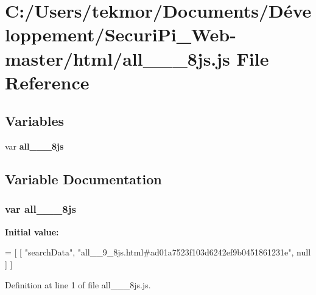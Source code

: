 \section{C\+:/\+Users/tekmor/\+Documents/\+Développement/\+Securi\+Pi\+\_\+\+Web-\/master/html/all\+\_\+\+\_\+\_\+8js.js File Reference}
\label{all____9__8js_8js}
\subsection*{Variables}
\begin{DoxyCompactItemize}
\item 
var {\bf all\+\_\+\+\_\+\_\+8js}
\end{DoxyCompactItemize}


\subsection{Variable Documentation}
\subsubsection[{all\+\_\+\+\_\+9\+\_\+8js}]{\setlength{\rightskip}{0pt plus 5cm}var all\+\_\+\+\_\+\_\+8js}\label{all____9__8js_8js_a100cd8b82a74294fb014101504168556}
{\bfseries Initial value\+:}
\begin{DoxyCode}
=
[
    [ \textcolor{stringliteral}{"searchData"}, \textcolor{stringliteral}{"all\_\_9\_8js.html#ad01a7523f103d6242ef9b0451861231e"}, null ]
]
\end{DoxyCode}


Definition at line 1 of file all\+\_\+\+\_\+\_\+8js.\+js.

